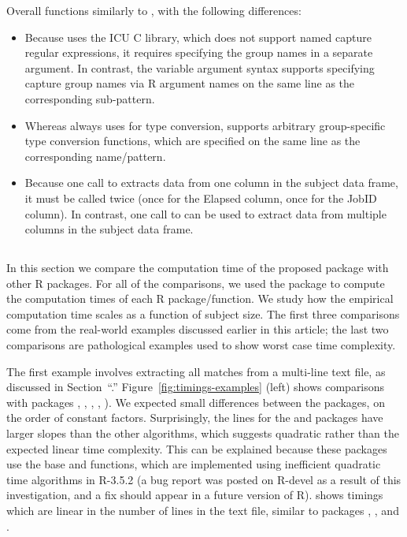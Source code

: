 Overall  functions
similarly to
, with the following
differences:
\begin{itemize}
\item Because  uses the ICU C library, which does
  not support named capture regular expressions, it requires
  specifying the group names in a separate argument. In contrast, the
   variable argument syntax supports specifying
  capture group names via R argument names on the same line as the
  corresponding sub-pattern.
\item Whereas  always uses
   for type conversion,
   supports arbitrary
  group-specific type conversion functions, which are specified on the
  same line as the corresponding name/pattern.
\item Because one call to  extracts data from one
  column in the subject data frame, it must be called twice (once for
  the Elapsed column, once for the JobID column). In contrast, one
  call to  can be used to
  extract data from multiple columns in the subject data frame. 
\end{itemize}

\subsection{\sectiontimings}
\label{sec:timings}

In this section we compare the computation time of the proposed
 package with other R packages. For all of the
comparisons, we used the  package to compute
the computation times of each R package/function. We study how the
empirical computation time scales as a function of subject size. The
first three comparisons come from the real-world examples discussed
earlier in this article; the last two comparisons are pathological examples
used to show worst case time complexity.

The first example involves extracting all matches from a multi-line
text file, as discussed in Section~``\sectiontrackDb.''
Figure~\ref{fig:timings-examples} (left) shows comparisons with
packages , , ,
, ). We expected small differences
between the packages, on the order of constant factors. Surprisingly,
the lines for the  and  packages have
larger slopes than the other algorithms, which suggests quadratic
rather than the expected linear time complexity. This can be explained
because these packages use the base  and
 functions, which are implemented using inefficient
quadratic time algorithms in R-3.5.2 (a bug report was posted on
R-devel as a result of this investigation, and a fix should appear in
a future version of R).  shows timings which are
linear in the number of lines in the text file, similar to packages
, , and .


